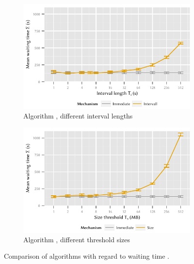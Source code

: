 \begin{figure}
	\begin{subfigure}[b]{\textwidth}
	\centering
	\includegraphics{application/cloud_file_synchronization/numerical_evaluation/figures/interval_delay}
	\caption{Algorithm \algointerval, different interval lengths \thresholdInterval}\label{fig:application:cloud_file_synchronisation:numerical_evaluation:waiting_time:waiting_time:interval}
	\end{subfigure}
	\begin{subfigure}[b]{\textwidth}
	\centering
	\includegraphics{application/cloud_file_synchronization/numerical_evaluation/figures/size_delay}
	\caption{Algorithm \algosize, different threshold sizes \thresholdSize}\label{fig:application:cloud_file_synchronisation:numerical_evaluation:waiting_time:waiting_time:size}
	\end{subfigure}

	\caption{Comparison of algorithms with regard to waiting time \sojournTime.}\label{fig:application:cloud_file_synchronisation:numerical_evaluation:waiting_time:waiting_time}
\end{figure}

